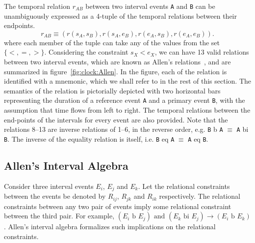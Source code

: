 The temporal relation $r_{AB}$ between two interval events \texttt{A} and \texttt{B} can be unambiguously expressed as a 4-tuple of  
the temporal relations between their endpoints. 
\begin{equation}
	r_{AB} \equiv ( r(s_A, s_B), r(s_A, e_B), r(e_A, s_B), r(e_A, e_B) ). 
\end{equation}
where each member of the tuple can take any of the values from the set $\{<,=,>\}$. 
Considering the constraint $s_X < e_X$, we can have 13 valid relations between two interval events, which are known as Allen's 
relations~\citep{Allen:1983}, and are summarized in figure~\ref{fig:clock:Allen}. 
%
In the figure, each of the relation is identified with a mnemonic, which we shall refer to in the rest of this section. The semantics 
of the relation is pictorially depicted with two horizontal bars representing the duration of a reference event \texttt{A} and 
a primary event \texttt{B}, with the assumption that time flows from left to right. The temporal relations between the end-points 
of the intervals for every event are also provided. 
Note that the relations 8--13 are inverse relations of 1--6, in the reverse order, e.g. 
\texttt{B} b \texttt{A} $\equiv$ \texttt{A} bi \texttt{B}. The inverse of the equality relation is itself, i.e. 
\texttt{B} eq \texttt{A} $\equiv$ \texttt{A} eq \texttt{B}.

\subsection{Allen's Interval Algebra}
\label{sec:clock:Allen-algebra}

Consider three interval events $E_i$, $E_j$ and $E_k$. Let the relational constraints between the events be denoted
by $R_{ij}$, $R_{jk}$ and $R_{ik}$ respectively.  The relational constraints between any two pair of events imply some relational 
constraint between the third pair. For example, 
$(E_i \text{ b } E_j) \text{ and } (E_k \text{ bi } E_j) \rightarrow (E_i \text{ b } E_k)$.
Allen's interval algebra formalizes such implications on the relational constraints.
 

